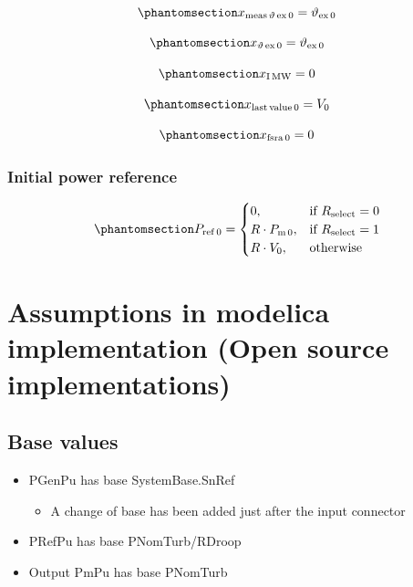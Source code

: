 \documentclass[
  a4paper,
  DIV=11,
  numbers=noendperiod]{scrartcl}
\providecommand{\tightlist}{%
  \setlength{\itemsep}{0pt}\setlength{\parskip}{0pt}}\usepackage{longtable,booktabs,array}
\begin{document}
\begin{equation}\phantomsection\label{eq-Texm}{
x_\mathrm{meas\,\vartheta\,ex\,0} = \vartheta_\mathrm{ex\,0}
}\end{equation}

\begin{equation}\phantomsection\label{eq-initTex}{
x_\mathrm{\vartheta\,ex\,0} = \vartheta_\mathrm{ex\,0}
}\end{equation}

\begin{equation}\phantomsection\label{eq-initXIMw}{
x_\mathrm{I\,MW} = 0
}\end{equation}

\begin{equation}\phantomsection\label{eq-initLastValue}{
x_\mathrm{last\,value\,0} = V_\mathrm{0}
}\end{equation}

\begin{equation}\phantomsection\label{eq-initFsra}{
x_\mathrm{fsra\,0} = 0
}\end{equation}

\subsubsection{Initial power reference}\label{initial-power-reference}

\begin{equation}\phantomsection\label{eq-initPRef}{
P_\mathrm{ref\,0} = 
\begin{cases}
    0,                         & \text{if } R_\mathrm{select}=0\\
    R \cdot P_\mathrm{m\,0},   & \text{if } R_\mathrm{select}=1\\
    R \cdot V_\mathrm{0},      & \text{otherwise}
\end{cases}
}\end{equation}

\section{Assumptions in modelica implementation (Open source
implementations)}\label{assumptions-in-modelica-implementation-open-source-implementations}

\subsection{Base values}\label{base-values}

\begin{itemize}
\tightlist
\item
  PGenPu has base SystemBase.SnRef

  \begin{itemize}
  \tightlist
  \item
    A change of base has been added just after the input connector
  \end{itemize}
\item
  PRefPu has base PNomTurb/RDroop
\item
  Output PmPu has base PNomTurb
\end{itemize}
\end{document}
